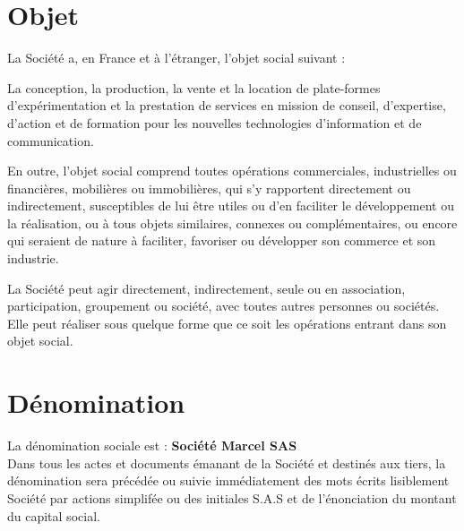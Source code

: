 \documentclass[a4paper,12pt]{report}
\begin{document}
\section{Objet}
La Société a, en France et à l'étranger, l'objet social suivant :

La conception, la production, la vente et la location de plate-formes d'expérimentation et la prestation de services en mission de conseil, d'expertise, d'action et de formation pour les nouvelles technologies d'information et de communication.

En outre, l'objet social comprend toutes opérations commerciales, industrielles ou financières, mobilières ou immobilières, qui s'y rapportent directement ou indirectement, susceptibles de lui être utiles ou d'en faciliter le développement ou la réalisation, ou à tous objets similaires, connexes ou complémentaires, ou encore qui seraient de nature à faciliter, favoriser ou développer son commerce et son industrie.

La Société peut agir directement, indirectement, seule ou en association, participation, groupement ou société, avec toutes autres personnes ou sociétés. Elle peut réaliser sous quelque forme que ce soit les opérations entrant dans son objet social.

\section{Dénomination}
La dénomination sociale est : \og \textbf{Société Marcel SAS} \fg{}\\
Dans tous les actes et documents émanant de la Société et destinés aux tiers, 
la dénomination sera précédée ou suivie immédiatement des mots écrits lisiblement \og Société par actions simplifée \fg{} 
ou des initiales \og S.A.S \fg{} et de l'énonciation du montant du capital social.
\end{document}
